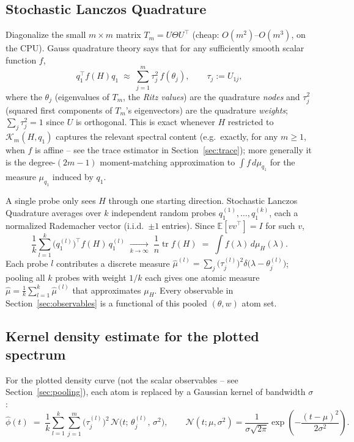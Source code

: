 \documentclass[11pt]{article}
\begin{document}
\subsection{Stochastic Lanczos Quadrature}
\label{sec:slq}

Diagonalize the small \(m\times m\) matrix \(T_m = U \Theta U^\top\)
(cheap: \(O(m^2)\)--\(O(m^3)\), on the CPU). Gauss quadrature theory says
that for any sufficiently smooth scalar function \(f\),
\[
q_1^\top f(H) q_1 \;\approx\; \sum_{j=1}^m \tau_j^2\, f(\theta_j),
\qquad \tau_j := U_{1j},
\]
where the \(\theta_j\) (eigenvalues of \(T_m\), the \emph{Ritz values}) are
the quadrature \emph{nodes} and \(\tau_j^2\) (squared first components of
\(T_m\)'s eigenvectors) are the quadrature \emph{weights}; \(\sum_j
\tau_j^2 = 1\) since \(U\) is orthogonal. This is exact whenever \(H\)
restricted to \(\mathcal{K}_m(H,q_1)\) captures the relevant spectral
content (e.g.\ exactly, for any \(m \ge 1\), when \(f\) is affine -- see
the trace estimator in Section~\ref{sec:trace}); more generally it is the
degree-\((2m-1)\) moment-matching approximation to \(\int f\,d\mu_{q_1}\)
for the measure \(\mu_{q_1}\) induced by \(q_1\).

A single probe only sees \(H\) through one starting direction. Stochastic
Lanczos Quadrature averages over \(k\) independent random probes
\(q_1^{(1)}, \dots, q_1^{(k)}\), each a normalized Rademacher vector (i.i.d.\
\(\pm1\) entries). Since \(\mathbb{E}[vv^\top] = I\) for such \(v\),
\[
\frac{1}{k}\sum_{l=1}^k \bigl(q_1^{(l)}\bigr)^{\!\top} f(H)\, q_1^{(l)}
\;\xrightarrow[k\to\infty]{}\;
\frac{1}{n}\operatorname{tr} f(H)
\;=\; \int f(\lambda)\, d\mu_H(\lambda).
\]
Each probe \(l\) contributes a discrete measure \(\hat\mu^{(l)} =
\sum_{j} \bigl(\tau_j^{(l)}\bigr)^2 \delta\bigl(\lambda -
\theta_j^{(l)}\bigr)\); pooling all \(k\) probes with weight \(1/k\) each
gives one atomic measure
\(\hat\mu = \frac1k\sum_{l=1}^k \hat\mu^{(l)}\)
that approximates \(\mu_H\). Every observable in Section~\ref{sec:observables}
is a functional of this pooled \((\theta, w)\) atom set.

\subsection{Kernel density estimate for the plotted spectrum}

For the plotted density curve (not the scalar observables -- see
Section~\ref{sec:pooling}), each atom is replaced by a Gaussian kernel of
bandwidth \(\sigma\):
\[
\hat\phi(t) \;=\; \frac{1}{k}\sum_{l=1}^k \sum_{j=1}^m
\bigl(\tau_j^{(l)}\bigr)^2\,
\mathcal{N}\!\bigl(t;\, \theta_j^{(l)},\, \sigma^2\bigr),
\qquad
\mathcal{N}(t;\mu,\sigma^2) = \frac{1}{\sigma\sqrt{2\pi}}
\exp\!\left(-\frac{(t-\mu)^2}{2\sigma^2}\right).
\]
\end{document}
